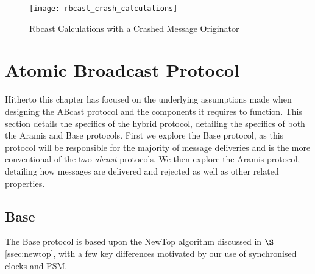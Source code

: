         \begin{sidewaysfigure}
            \vspace*{-1cm}
            \strictpagecheck
            \checkoddpage
            \ifoddpage
                \hspace*{-2.5cm}
            \fi           
            \centering
                \texttt{[image: rbcast\_crash\_calculations]}
            \caption[Rbcast Calculation Diagram with a Crashed Message Originator]{Rbcast Calculations with a Crashed Message Originator}
            \label{fig:rbcast_crash_calc}
       \end{sidewaysfigure}

				
\clearpage
\section{Atomic Broadcast Protocol}\label{sec:ABcast}
Hitherto this chapter has focused on the underlying assumptions made when designing the \textsf{ABcast} protocol and the components it requires to function.  This section details the specifics of the hybrid protocol, detailing the specifics of both the \textsf{Aramis} and \textsf{Base} protocols.  First we explore the \textsf{Base} protocol, as this protocol will be responsible for the majority of message deliveries and is the more conventional of the two \emph{abcast} protocols.  We then explore the \textsf{Aramis} protocol, detailing how messages are delivered and rejected as well as other related properties.  

    \subsection{Base}
    The \textsf{Base} protocol is based upon the NewTop \citep{Ezhilchelvan:1995:NFG:876885.880005} algorithm discussed in $\S$ \ref{ssec:newtop}, with a few key differences motivated by our use of synchronised clocks and PSM.  
    
